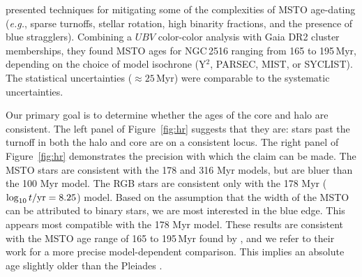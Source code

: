 \documentclass[12pt,twocolumn,tighten]{aastex63}
\begin{document}
\citet{cummings_2018} presented techniques for mitigating some of the
complexities of MSTO age-dating ({\it e.g.}, sparse turnoffs, stellar
rotation, high binarity fractions, and the presence of blue
stragglers).  Combining a $UBV$ color-color analysis with Gaia DR2
cluster memberships, they found MSTO ages for NGC\,2516 ranging from
165 to 195\,Myr, depending on the choice of model isochrone (Y$^2$,
PARSEC, MIST, or SYCLIST).  The statistical uncertainties ($\approx
25$\,Myr) were comparable to the systematic uncertainties.

Our primary goal is to determine whether the ages of the core and halo
are consistent.  The left panel of Figure~\ref{fig:hr} suggests that
they are: stars past the turnoff in both the halo and core are on a
consistent locus.  The right panel of Figure~\ref{fig:hr} demonstrates
the precision with which the claim can be made.  The MSTO stars are
consistent with the 178 and 316 Myr models, but are bluer than the 100
Myr model.  The RGB stars are consistent only with the 178 Myr
($\log_{10} t/{\rm yr} = 8.25$) model.  Based on the assumption that
the width of the MSTO can be attributed to binary stars, we are most
interested in the blue edge. This appears most compatible with the 178
Myr model.  These results are consistent with the MSTO age range of
165 to 195\,Myr found by \citet{cummings_2018}, and we refer to their
work for a more precise model-dependent comparison.
This implies an absolute age slightly older than the Pleiades
\citep[{\it cf.}][]{mermilliod_comparative_1981}.


% 
\end{document}
